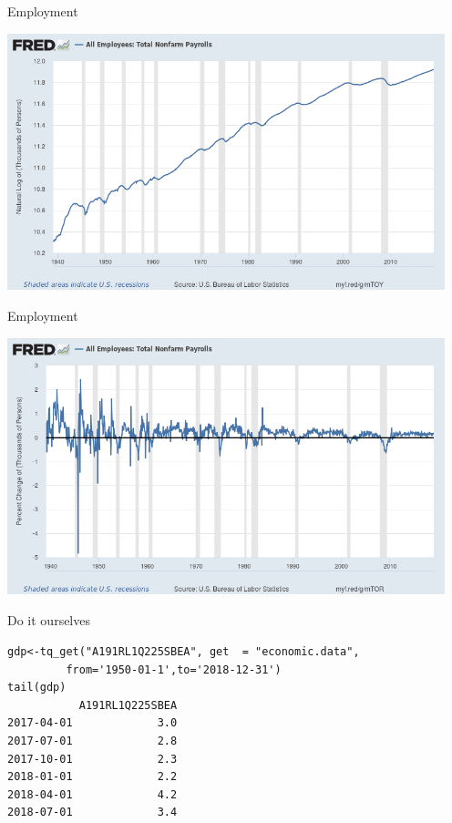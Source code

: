 \documentclass[aspectratio=169]{beamer}
\begin{document}
\begin{frame}{Employment}
\begin{center}
\includegraphics[width=5in]{./resources/nonfarm_log.png}
\end{center}
\end{frame}

\begin{frame}{Employment}
\begin{center}
\includegraphics[width=5in]{./resources/nonfarm_pct.png}
\end{center}
\end{frame}

\begin{frame}[fragile]{Do it ourselves}
\begin{verbatim}
gdp<-tq_get("A191RL1Q225SBEA", get  = "economic.data",
         from='1950-01-1',to='2018-12-31')
tail(gdp)
           A191RL1Q225SBEA
2017-04-01             3.0
2017-07-01             2.8
2017-10-01             2.3
2018-01-01             2.2
2018-04-01             4.2
2018-07-01             3.4
\end{verbatim}
\end{frame}
\end{document}
